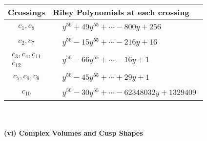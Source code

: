\documentclass[1p]{elsarticle_modified}
\theoremstyle{definition}
\begin{document}
\begin{tabular}{m{50pt}|m{274pt}}
Crossings & \hspace{64pt}Riley Polynomials at each crossing \\
\hline $$\begin{aligned}c_{1},c_{8}\end{aligned}$$&$\begin{aligned}
&y^{56}+49 y^{55}+\cdots-800 y+256
\end{aligned}$\\
\hline $$\begin{aligned}c_{2},c_{7}\end{aligned}$$&$\begin{aligned}
&y^{56}-15 y^{55}+\cdots-216 y+16
\end{aligned}$\\
\hline $$\begin{aligned}c_{3},c_{4},c_{11}\\c_{12}\end{aligned}$$&$\begin{aligned}
&y^{56}-66 y^{55}+\cdots-16 y+1
\end{aligned}$\\
\hline $$\begin{aligned}c_{5},c_{6},c_{9}\end{aligned}$$&$\begin{aligned}
&y^{56}-45 y^{55}+\cdots+29 y+1
\end{aligned}$\\
\hline $$\begin{aligned}c_{10}\end{aligned}$$&$\begin{aligned}
&y^{56}-30 y^{55}+\cdots-62348032 y+1329409
\end{aligned}$\\
\hline
\end{tabular}\\~\\
\newpage\flushleft \textbf{(vi) Complex Volumes and Cusp Shapes}
\end{document}
